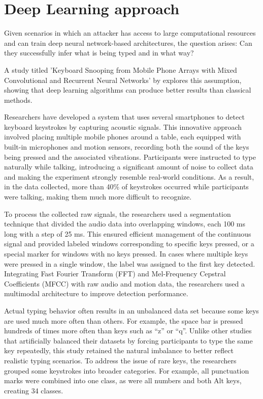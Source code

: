 \documentclass[a4paper,11pt,twoside]{report}
\theoremstyle{definition}
\begin{document}
\section*{Deep Learning approach}

Given scenarios in which an attacker has access to large computational resources and can train deep neural network-based architectures, the question arises: Can they successfully infer what is being typed and in what way?

A study titled 'Keyboard Snooping from Mobile Phone Arrays with Mixed Convolutional and Recurrent Neural Networks' by \textit{\cite{cnn2019noise}} explores this assumption, showing that deep learning algorithms can produce better results than classical methods.

Researchers have developed a system that uses several smartphones to detect keyboard keystrokes by capturing acoustic signals. This innovative approach involved placing multiple mobile phones around a table, each equipped with built-in microphones and motion sensors, recording both the sound of the keys being pressed and the associated vibrations. Participants were instructed to type naturally while talking, introducing a significant amount of noise to collect data and making the experiment strongly resemble real-world conditions. As a result, in the data collected, more than 40\% of keystrokes occurred while participants were talking, making them much more difficult to recognize.

To process the collected raw signals, the researchers used a segmentation technique that divided the audio data into overlapping windows, each 100 ms long with a step of 25 ms. This ensured efficient management of the continuous signal and provided labeled windows corresponding to specific keys pressed, or a special marker for windows with no keys pressed. In cases where multiple keys were pressed in a single window, the label was assigned to the first key detected. Integrating Fast Fourier Transform (FFT) and Mel-Frequency Cepstral Coefficients (MFCC) with raw audio and motion data, the researchers used a multimodal architecture to improve detection performance.

Actual typing behavior often results in an unbalanced data set because some keys are used much more often than others. For example, the space bar is pressed hundreds of times more often than keys such as “z” or “q”. Unlike other studies that artificially balanced their datasets by forcing participants to type the same key repeatedly, this study retained the natural imbalance to better reflect realistic typing scenarios. To address the issue of rare keys, the researchers grouped some keystrokes into broader categories. For example, all punctuation marks were combined into one class, as were all numbers and both Alt keys, creating 34 classes.
\end{document}
